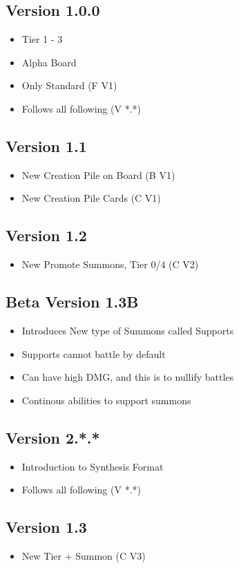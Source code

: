 \documentclass[12pt, letterpaper]{article}
\begin{document}
\subsection{Version 1.0.0}
\begin{itemize}
    \item Tier 1 - 3
    \item Alpha Board
    \item Only Standard (F V1)
    \item Follows all following (V *.*)
\end{itemize}
%
\subsection{Version 1.1}
\begin{itemize}
    \item New Creation Pile on Board (B V1)
    \item New Creation Pile Cards (C V1)
\end{itemize}
%
\subsection{Version 1.2}
\begin{itemize}
    \item New Promote Summons, Tier 0/4 (C V2)
\end{itemize}
%
\subsection{Beta Version 1.3B}
\begin{itemize}
    \item Introduces New type of Summons called Supports
    \item Supports cannot battle by default
    \item Can have high DMG, and this is to nullify battles 
    \item Continous abilities to support summons
\end{itemize}
%
\subsection{Version 2.*.*}
\begin{itemize}
    \item Introduction to Synthesis Format 
    \item Follows all following (V *.*)
\end{itemize}
%
\subsection{Version 1.3}
\begin{itemize}
    \item New Tier + Summon (C V3)
\end{itemize}
%
\end{document}
